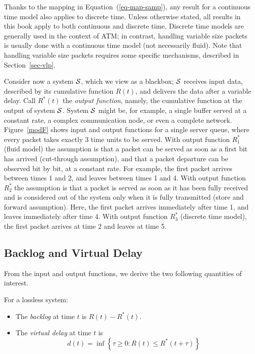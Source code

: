 Thanks to the mapping in Equation~(\ref{eq-map-samp}), any result
for a continuous time model also applies to discrete time. Unless
otherwise stated, all results in this book apply to both
continuous and discrete time. Discrete time models are generally
used in the context of ATM; in contrast, handling variable size
packets is usually done with a continuous time model (not
necessarily fluid). Note that handling variable size packets
requires some specific mechanisms, described in
Section~\ref{sec-vlp}.

Consider now a system $\mathcal S$, which we view as a blackbox;
$\mathcal S$ receives input data, described by its cumulative function
$R(t)$, and delivers the data after a variable delay. Call
$R^{*}(t)$ the \emph{output function}, namely, the cumulative
function at the output of system $\mathcal S$. System $\mathcal S$ might be,
for example, a single buffer served at a constant rate, a complex
communication node, or even a complete network. Figure~\ref{modF}
shows input and output functions for a single server queue, where
every packet takes exactly 3 time units to be served. With output
function $R^*_1$ (fluid model) the assumption is that a packet can
be served as soon as a first bit has arrived (cut-through
assumption), and that a packet departure can be observed bit by
bit, at a constant rate. For example, the first packet arrives
between times 1 and 2, and leaves between times 1 and 4. With
output function $R^*_2$ the assumption is that a packet is served
as soon as it has been fully received and is considered out of the
system only when it is fully transmitted (store and forward
assumption). Here, the first packet arrives immediately after time
1, and leaves immediately after time 4. With output function
$R^*_3$ (discrete time model), the first packet arrives at time 2
and leaves at time 5.

\subsection{Backlog and Virtual Delay}
\label{sec-vd}
From the input and output functions, we derive the two following
quantities of interest.
\begin{definition}
 For a lossless system:
\begin{itemize}
        \item  The \emph{backlog} at time $t$ is $R(t) - R^{*}(t)$.
        \item  The \emph{virtual delay} at time $t$ is
        $$d(t) = \inf \left\{
               \tau \geq 0 : R(t) \leq R^*(t + \tau)
              \right\}
    $$
\end{itemize}
\end{definition}

